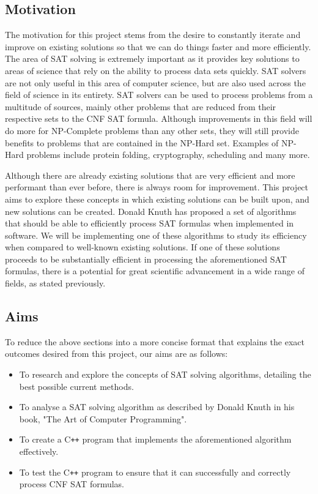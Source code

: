 \documentclass{article}
\begin{document}
\subsection{Motivation}
The motivation for this project stems from the desire to constantly iterate and improve on existing solutions so that we can do things
faster and more efficiently. The area of SAT solving is extremely important as it provides key solutions to areas of science that rely on
the ability to process data sets quickly. SAT solvers are not only useful in this area of computer science, but are also used across the
field of science in its entirety. SAT solvers can be used to process problems from a multitude of sources, mainly other problems that are
reduced from their respective sets to the CNF SAT formula. Although improvements in this field will do more for NP-Complete problems than
any other sets, they will still provide benefits to problems that are contained in the NP-Hard set. Examples of NP-Hard problems include
protein folding, cryptography, scheduling and many more.

Although there are already existing solutions that are very efficient and more performant than ever before, there is always room for
improvement. This project aims to explore these concepts in which existing solutions can be built upon, and new solutions can be created.
Donald Knuth has proposed a set of algorithms that should be able to efficiently process SAT formulas when implemented in software. We will
be implementing one of these algorithms to study its efficiency when compared to well-known existing solutions. If one of these solutions
proceeds to be substantially efficient in processing the aforementioned SAT formulas, there is a potential for great scientific advancement
in a wide range of fields, as stated previously.

\subsection{Aims}
To reduce the above sections into a more concise format that explains the exact outcomes desired from this project, our aims are as follows:

\begin{itemize}
    \item To research and explore the concepts of SAT solving algorithms, detailing the best possible current methods.
    \item To analyse a SAT solving algorithm as described by Donald Knuth in his book, "The Art of Computer Programming".
    \item To create a C\texttt{++} program that implements the aforementioned algorithm effectively.
    \item To test the C\texttt{++} program to ensure that it can successfully and correctly process CNF SAT formulas.
\end{itemize}
\end{document}
